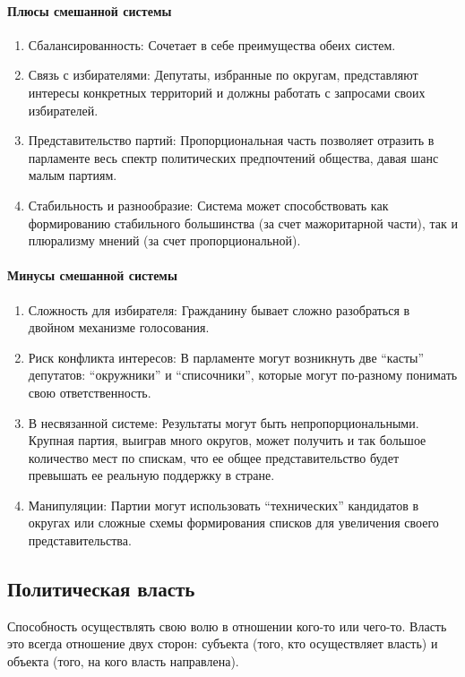 \documentclass[12pt]{article}
\begin{document}
	\paragraph{Плюсы смешанной системы}
	\begin{enumerate}
		\item Сбалансированность: Сочетает в себе преимущества обеих систем.
		\item Связь с избирателями: Депутаты, избранные по округам, представляют интересы конкретных территорий и должны работать с запросами своих избирателей.
		\item Представительство партий: Пропорциональная часть позволяет отразить в парламенте весь спектр политических предпочтений общества, давая шанс малым партиям.
		\item Стабильность и разнообразие: Система может способствовать как формированию стабильного большинства (за счет мажоритарной части), так и плюрализму мнений (за счет пропорциональной).
	\end{enumerate}
	\paragraph{Минусы смешанной системы}
	\begin{enumerate}
		\item Сложность для избирателя: Гражданину бывает сложно разобраться в двойном механизме голосования.
		\item Риск конфликта интересов: В парламенте могут возникнуть две ``касты'' депутатов: ``окружники'' и ``списочники'', которые могут по-разному понимать свою ответственность.
		\item В несвязанной системе: Результаты могут быть непропорциональными. Крупная партия, выиграв много округов, может получить и так большое количество мест по спискам, что ее общее представительство будет превышать ее реальную поддержку в стране.
		\item Манипуляции: Партии могут использовать ``технических'' кандидатов в округах или сложные схемы формирования списков для увеличения своего представительства.
	\end{enumerate}
	\subsection{Политическая власть}
	\begin{definition}[Власть]
		Способность осуществлять свою волю в отношении кого-то или чего-то. Власть это всегда отношение двух сторон: субъекта (того, кто осуществляет власть) и объекта (того, на кого власть направлена).
	\end{definition}
\end{document}
